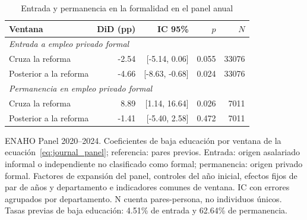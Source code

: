 \begin{table}[!htbp]\centering
\caption{Entrada y permanencia en la formalidad en el panel anual}\label{tab:journal_panel}
\begin{threeparttable}\small
\setlength{\tabcolsep}{5pt}
\begin{tabular}{lrrrr}
\toprule
Ventana & DiD (pp) & IC 95\% & $p$ & $N$ \\
\midrule
\multicolumn{5}{l}{\emph{Entrada a empleo privado formal}} \\
Cruza la reforma & -2.54 & [-5.14, 0.06] & 0.055 & 33076 \\
Posterior a la reforma & -4.66 & [-8.63, -0.68] & 0.024 & 33076 \\
\multicolumn{5}{l}{\emph{Permanencia en empleo privado formal}} \\
Cruza la reforma & 8.89 & [1.14, 16.64] & 0.026 & 7011 \\
Posterior a la reforma & -1.41 & [-5.40, 2.58] & 0.472 & 7011 \\
\bottomrule
\end{tabular}
\begin{tablenotes}\footnotesize
\item ENAHO Panel 2020--2024. Coeficientes de baja educación por ventana de la ecuación~\eqref{eq:journal_panel}; referencia: pares previos. Entrada: origen asalariado informal o independiente no clasificado como formal; permanencia: origen privado formal. Factores de expansión del panel, controles del año inicial, efectos fijos de par de años y departamento e indicadores comunes de ventana. IC con errores agrupados por departamento. N cuenta pares-persona, no individuos únicos. Tasas previas de baja educación: 4.51\% de entrada y 62.64\% de permanencia.
\end{tablenotes}\end{threeparttable}\end{table}
